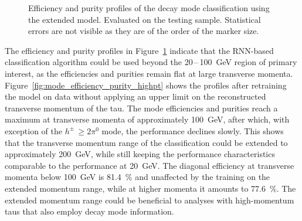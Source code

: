 \begin{figure}[htb]
\begin{subfigure}{0.48\textwidth}
    \vspace*{-1.6em}
    \subcaption{}
  \end{subfigure}
  \caption{Efficiency and purity profiles of the decay mode classification using
    the extended model. Evaluated on the testing sample. Statistical errors are
    not visible as they are of the order of the marker size.}
  \label{fig:mode_efficiency_purity}
\end{figure}

The efficiency and purity profiles in Figure~\ref{fig:mode_efficiency_purity}
indicate that the RNN-based classification algorithm could be used beyond the
20\,--\,\SI{100}{\GeV} region of primary interest, as the efficiencies and
purities remain flat at large transverse momenta.
Figure~\ref{fig:mode_efficiency_purity_highpt} shows the profiles after
retraining the model on data without applying an upper limit on the
reconstructed transverse momentum of the tau. The mode efficiencies and purities
reach a maximum at transverse momenta of approximately \SI{100}{\GeV}, after
which, with exception of the $h^\pm \, {\geq} 2 \pi^0$ mode, the performance
declines slowly.
This shows that the transverse momentum range of the classification could be
extended to approximately \SI{200}{\GeV}, while still keeping the performance
characteristics comparable to the performance at \SI{20}{\GeV}. The diagonal
efficiency at transverse momenta below \SI{100}{\GeV} is \SI{81.4}{\percent} and
unaffected by the training on the extended momentum range, while at higher
momenta it amounts to \SI{77.6}{\percent}. The extended momentum range could be
beneficial to analyses with high-momentum taus that also employ decay mode
information. 


